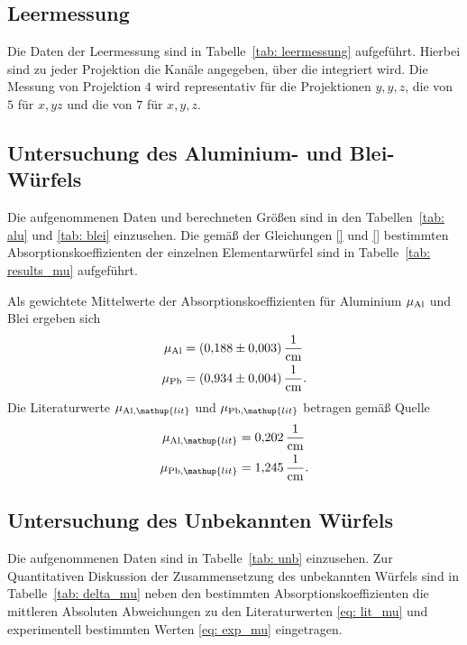 \subsection{Leermessung}
Die Daten der Leermessung sind in Tabelle~\ref{tab: leermessung} aufgeführt. Hierbei sind zu jeder Projektion
die Kanäle angegeben, über die integriert wird. Die Messung von Projektion $4$ wird representativ für die
Projektionen $y, y, z$, die von $5$ für $x,yz$ und die von $7$ für $x, y, z$.


\subsection{Untersuchung des Aluminium- und Blei-Würfels}
Die aufgenommenen Daten und berechneten Größen sind in den Tabellen~\ref{tab: alu} und \ref{tab: blei} einzusehen.
Die gemäß der Gleichungen \eqref{} und \eqref{} bestimmten Absorptionskoeffizienten
der einzelnen Elementarwürfel sind in Tabelle~\ref{tab: results_mu} aufgeführt.
\FloatBarrier



Als gewichtete Mittelwerte der Absorptionskoeffizienten für Aluminium $\mu_{\ce{Al}}$ und Blei
ergeben sich
\begin{align}
  \begin{aligned}
  \mu_{\ce{Al}} &= \SI{0.188(3)}{\per\centi\meter}\\
  \mu_{\ce{Pb}} &= \SI{0.934(4)}{\per\centi\meter}.
  \label{eq: exp_mu}
\end{aligned}
\end{align}
Die Literaturwerte $\mu_{\ce{Al}, \mathup{lit}}$ und $\mu_{\ce{Pb}, \mathup{lit}}$ betragen gemäß Quelle \cite{}
\begin{align}
  \begin{aligned}
  \mu_{\ce{Al}, \mathup{lit}} &= \SI{0.202}{\per\centi\meter} \\
  \mu_{\ce{Pb}, \mathup{lit}} &= \SI{1.245}{\per\centi\meter}.
  \label{eq: lit_mu}
\end{aligned}
\end{align}

\FloatBarrier

\subsection{Untersuchung des Unbekannten Würfels}
Die aufgenommenen Daten sind in Tabelle~\ref{tab: unb} einzusehen. Zur Quantitativen Diskussion der Zusammensetzung
des unbekannten Würfels sind in Tabelle~\ref{tab: delta_mu} neben den bestimmten Absorptionskoeffizienten die mittleren Absoluten
Abweichungen zu den Literaturwerten \eqref{eq: lit_mu} und experimentell bestimmten Werten \eqref{eq: exp_mu} eingetragen.
\FloatBarrier



\FloatBarrier

